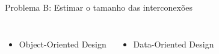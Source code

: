 \begin{frame}{Problema B: Estimar o tamanho das interconexões}


    \begin{minipage}[c][.3\textheight][c]{1\textwidth}
        \centering
        \vspace{1.4cm}
    \end{minipage}
    \begin{minipage}[c][.7\textheight][c]{1\textwidth}
        \begin{columns}
                \begin{itemize}
                    \item Object-Oriented Design
                \end{itemize}
                \centering
                \begin{itemize}
                    \item Data-Oriented Design
                \end{itemize}
                \vspace{.5cm}
        \end{columns}
    \end{minipage}
        
\end{frame}

